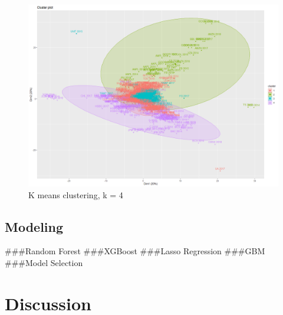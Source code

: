 \documentclass[11pt,]{article}
\begin{document}
\begin{figure}
\includegraphics[width=1\linewidth,height=0.7\textheight]{cluster_image} \caption{K means clustering, k = 4}\label{fig:cluster}
\end{figure}

\hypertarget{modeling-1}{%
\subsection{Modeling}\label{modeling-1}}

\#\#\#Random Forest \#\#\#XGBoost \#\#\#Lasso Regression \#\#\#GBM
\#\#\#Model Selection

\hypertarget{discussion}{%
\section{Discussion}\label{discussion}}





\newpage
\singlespacing 
\end{document}
